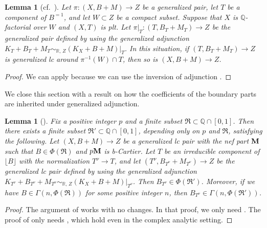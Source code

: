 \documentclass[12pt]{amsart}
\newtheorem{lem}[thm]{Lemma}
\theoremstyle{definition}
\begin{document}
\begin{lem}[cf.~{\cite[Lemma 3.2]{birkar-compl}}]\label{lem--gen-inv-adj}
Let $\pi \colon (X,B+M) \to Z$ be a generalized pair, let $T$ be a component of $B^{=1}$, and let $W \subset Z$ be a compact subset.   
Suppose that $X$ is $\mathbb{Q}$-factorial over $W$ and $(X,T)$ is plt.
Let $\pi|_{T}\colon (T,B_{T}+M_{T}) \to Z$ be the generalized pair defined by using the generalized adjunction $K_{T}+B_{T}+M_{T}\sim_{\mathbb{R},\,Z}(K_{X}+B+M)|_{T}$. 
In this situation, if $(T,B_{T}+M_{T}) \to Z$ is generalized lc around $\pi^{-1}(W) \cap T$, then so is $(X,B+M) \to Z$. 
\end{lem}


\begin{proof}
We can apply \cite[Proof of Lemma 3.2]{birkar-compl} because we can use the inversion of adjunction \cite[Theorem 1.1]{fujino-analytic-inv-adjunction}. 
\end{proof}


We close this section with a result on how the coefficients of the boundary parts are inherited under generalized adjunction.


\begin{lem}[{\cite[Proposition 3.2]{chhx-compl}}]\label{lem--adj-coeff}
Fix a positive integer $p$ and a finite subset $\mathfrak{R} \subset \mathbb{Q}\cap[0,1]$. 
Then there exists a finite subset $\mathfrak{R}' \subset \mathbb{Q}\cap[0,1]$, depending only on $p$ and $\mathfrak{R}$, satisfying the following.
Let $(X,B+M)\to Z$ be a generalized lc pair with the nef part $\boldsymbol{\rm M}$ such that $B \in \Phi(\mathfrak{R})$ and $p \boldsymbol{\rm M}$ is b-Cartier. 
Let $T$ be an irreducible component of $\lfloor B \rfloor$ with the normalization $T^{\nu} \to T$, and let $(T^{\nu}, B_{T^{\nu}}+M_{T^{\nu}}) \to Z$ be the generalized lc pair defined by using the generalized adjunction $K_{T^{\nu}}+B_{T^{\nu}}+M_{T^{\nu}}\sim_{\mathbb{R},\,Z}(K_{X}+B+M)|_{T^{\nu}}$. 
Then $B_{T^{\nu}} \in \Phi(\mathfrak{R}')$. 
Moreover, if we have $B \in \Gamma(n, \Phi(\mathfrak{R}))$ for some positive integer $n$, then $B_{T^{\nu}} \in \Gamma(n, \Phi(\mathfrak{R}'))$. 
\end{lem}

\begin{proof}
The argument of \cite[Proof of Proposition 3.2]{chhx-compl} works with no changes. 
In that proof, we only need \cite[Lemma 3.3]{birkar-compl}. 
The proof of \cite[Lemma 3.3]{birkar-compl} only needs \cite[3.9.~Proposition, 3.10.~Corollary]{shokurov-flip}, which hold even in the complex analytic setting. 
\end{proof}
\end{document}
